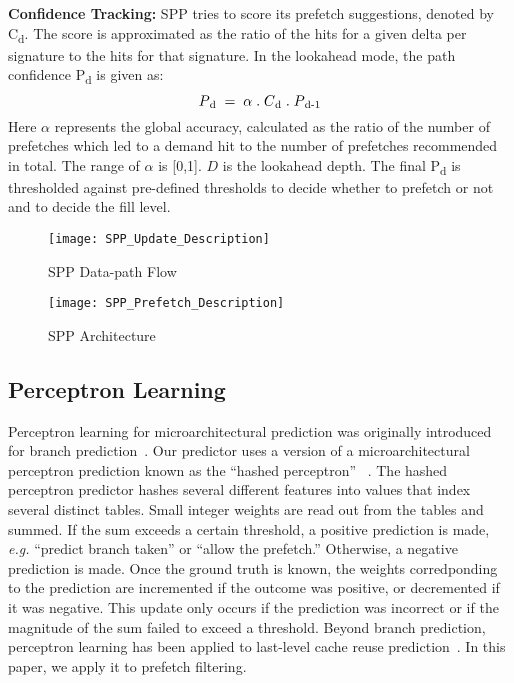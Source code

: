 \noindent \textbf{Confidence Tracking:} 
SPP tries to score its prefetch suggestions, denoted by C\textsubscript{d}.
The score is approximated as the ratio of the hits for a given delta per
signature to the hits for that signature. In the lookahead mode, the path
confidence P\textsubscript{d} is given as: $$P\textsubscript{d} \;=\; \alpha  
\;.\;  C\textsubscript{d}  \;.\; P\textsubscript{d-1}$$ Here $\alpha$ represents 
the global accuracy, calculated as the ratio of the number of prefetches which 
led to a demand hit to the number of prefetches recommended in total. The range
of $\alpha$ is [0,1].  $D$ is the lookahead depth. The final P\textsubscript{d} 
is thresholded against pre-defined thresholds to decide whether to prefetch or 
not and to decide the fill level.

\begin{figure}
  \begin{center}
  \texttt{[image: SPP\_Update\_Description]}
  \caption{SPP Data-path Flow}
  \label{fig:spp_update}
  \end{center}
\end{figure}


\begin{figure}
  \begin{center}
  \texttt{[image: SPP\_Prefetch\_Description]}
  \caption{SPP Architecture}
  \label{fig:spp_structure}
  \end{center}
\end{figure}

\subsection{Perceptron Learning}
\label{sec:Background-Perceptron}
Perceptron learning for microarchitectural prediction was originally
introduced for branch prediction~\cite{PerceptronPredictor}.
Our predictor uses a version of a microarchitectural perceptron 
prediction known as the ``hashed perceptron'' ~\cite{HashedPerceptron}. 
The hashed perceptron predictor hashes several different
features into values that index several distinct tables. Small integer
weights are read out from the tables and summed. If the sum exceeds
a certain threshold, a positive prediction is made, {\em e.g.} ``predict
branch taken'' or ``allow the prefetch.'' Otherwise, a negative
prediction is made. Once the ground truth is known, the weights
corredponding to the prediction are incremented if the outcome was
positive, or decremented if it was negative. This update only occurs
if the prediction was incorrect or if the magnitude of the sum failed
to exceed a threshold.  Beyond branch prediction, perceptron learning
has been applied to last-level cache reuse
prediction~\cite{Perc_Reuse,Multiperspective}. In this paper, we apply
it to prefetch filtering.
